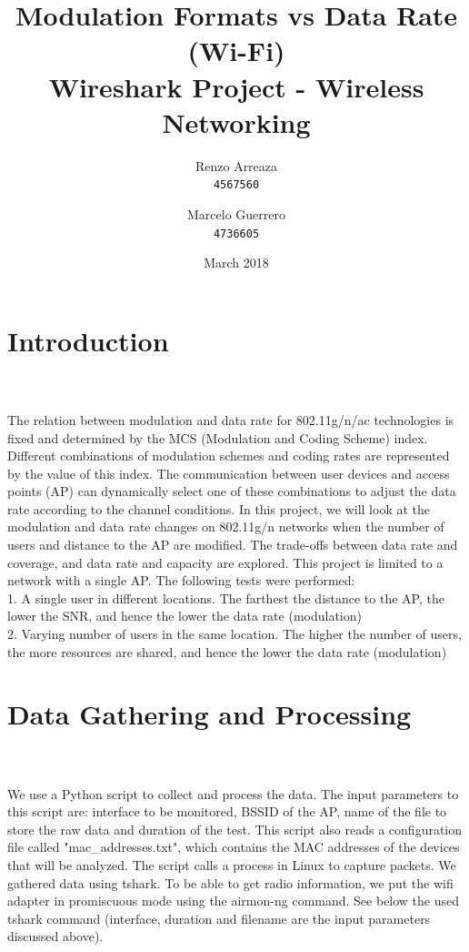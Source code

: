 \documentclass[12]{article}
\title{Modulation Formats vs Data Rate (Wi-Fi)\\
        Wireshark Project - Wireless Networking}
\author{
    Renzo Arreaza\\
    \texttt{4567560}
    \and
    Marcelo Guerrero\\
    \texttt{4736605}
}
\date{March 2018}
\begin{document}
\maketitle

\section{Introduction}\\\\
The relation between modulation and data rate for 802.11g/n/ac technologies is fixed and determined by the MCS (Modulation and Coding Scheme) index. Different combinations of modulation schemes and coding rates are represented by the value of this index. The communication between user devices and access points (AP) can dynamically select one of these combinations to adjust the data rate according to the channel conditions. In this project, we will look at the modulation and data rate changes on 802.11g/n networks when the number of users and distance to the AP are modified. The trade-offs between data rate and coverage, and data rate and capacity are explored. This project is limited to a network with a single AP. The following tests were performed:\\

1. A single user in different locations. The farthest the distance to the AP, the lower the SNR, and hence the lower the data rate (modulation)\\
2. Varying number of users in the same location. The higher the number of users, the more resources are shared, and hence the lower the data rate (modulation)

\section{Data Gathering and Processing}\\\\
We use a Python script to collect and process the data. The input parameters to this script are: interface to be monitored, BSSID of the AP, name of the file to store the raw data and duration of the test. This script also reads a configuration file called "mac\_addresses.txt", which contains the MAC addresses of the devices that will be analyzed. The script calls a process in Linux to capture packets. We gathered data using tshark. To be able to get radio information, we put the wifi adapter in promiscuous mode using the airmon-ng command. See below the used tshark command (interface, duration and filename are the input parameters discussed above).\\
\end{document}
